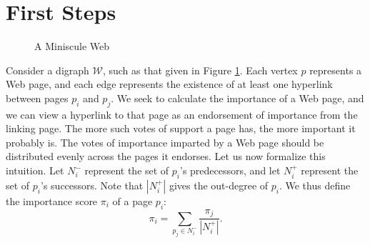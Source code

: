 \documentclass[12pt]{article}
\begin{document}
\section{First Steps}
\begin{figure}[h]
  \centering {}
  \caption{A Miniscule Web}
  \label{fig:web}
\end{figure}
Consider a digraph $\mathcal{W}$, such as that given in Figure \ref{fig:web}.
Each vertex $p$ represents a Web page, and each edge represents the existence of
at least one hyperlink between pages $p_i$ and $p_j$. We seek to calculate the
importance of a Web page, and we can view a hyperlink to that page as an
endorsement of importance from the linking page. The more such votes of support
a page has, the more important it probably is. The votes of importance imparted
by a Web page should be distributed evenly across the pages it endorses. Let us
now formalize this intuition. Let $N^-_i$ represent the set of $p_i$'s
predecessors, and let $N^+_i$ represent the set of $p_i$'s successors. Note that
$|N^+_i|$ gives the out-degree of $p_i$. We thus define the importance score
$\pi_i$ of a page $p_i$:
\begin{equation}\label{eqn:pi_i}
  \pi_i = \sum_{p_j\in N^-_i}{\frac{\pi_j}{|N^+_i|}}.
\end{equation}
\end{document}
